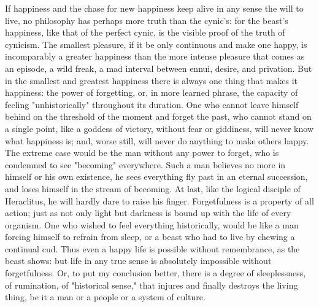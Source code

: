 If happiness and the chase for new happiness keep alive in any sense
the will to live, no philosophy has perhaps more truth than the
cynic's: for the beast's happiness, like that of the perfect cynic,
is the visible proof of the truth of cynicism. The smallest pleasure,
if it be only continuous and make one happy, is incomparably a
greater happiness than the more intense pleasure that comes as an
episode, a wild freak, a mad interval between ennui, desire, and
privation. But in the smallest and greatest happiness there is always
one thing that makes it happiness: the power of forgetting, or, in
more learned phrase, the capacity of feeling "unhistorically"
throughout its duration. One who cannot leave himself behind on the
threshold of the moment and forget the past, who cannot stand on a
single point, like a goddess of victory, without fear or giddiness,
will never know what happiness is; and, worse still, will never do
anything to make others happy. The extreme case would be the man
without any power to forget, who is condemned to see "becoming"
everywhere. Such a man believes no more in himself or his own
existence, he sees everything fly past in an eternal succession, and
loses himself in the stream of becoming. At last, like the logical
disciple of Heraclitus, he will hardly dare to raise his finger.
Forgetfulness is a property of all action; just as not only light but
darkness is bound up with the life of every organism. One who wished
to feel everything historically, would be like a man forcing himself
to refrain from sleep, or a beast who had to live by chewing a
continual cud. Thus even a happy life is possible without
remembrance, as the beast shows: but life in any true sense is
absolutely impossible without forgetfulness. Or, to put my conclusion
better, there is a degree of sleeplessness, of rumination, of
"historical sense," that injures and finally destroys the living
thing, be it a man or a people or a system of culture.

